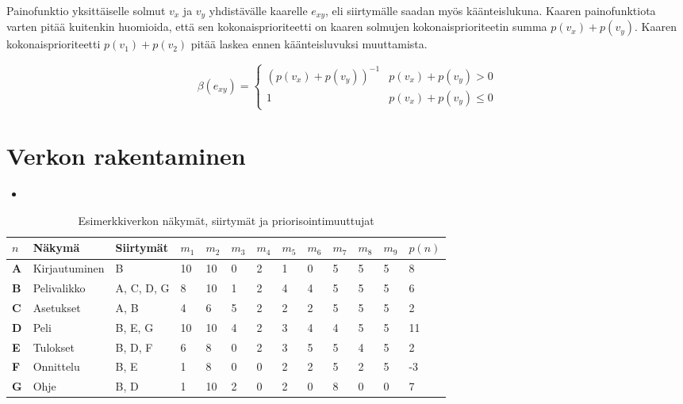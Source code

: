   Painofunktio yksittäiselle solmut \(v_x\) ja \(v_y\) yhdistävälle kaarelle \(e_{xy}\), eli siirtymälle saadan myös käänteislukuna.
  Kaaren painofunktiota varten pitää kuitenkin huomioida, että sen kokonaisprioriteetti on kaaren solmujen kokonaisprioriteetin summa \(p(v_x) + p(v_y)\).
  Kaaren kokonaisprioriteetti \(p(v_1) + p(v_2)\) pitää laskea ennen käänteisluvuksi muuttamista.

  \[\beta(e_{xy}) = \begin{cases}
    (p(v_x) + p(v_y))^{-1} & p(v_x) + p(v_y) > 0 \\
    1 & p(v_x) + p(v_y) \leq 0
  \end{cases}\]

\section{Verkon rakentaminen} \label{ch:10_verkon_rakentaminen}

  \begin{itemize}
    \item <TODO: Kirjoita teksti miten verkon solmut ja kaaret poimitaan käyttöliittymästä>
  \end{itemize}

  \begin{table}[H]
    \caption{Esimerkkiverkon näkymät, siirtymät ja priorisointimuuttujat}
    \label{tab:esimerkki_verkon_priorisointi_muuttujat}
    \centering
    \begin{tabular}{lllllllllllll} \hline
    \(n\) & \textbf{Näkymä} & \textbf{Siirtymät} & \(m_1\) & \(m_2\) & \(m_3\) & \(m_4\) & \(m_5\) & \(m_6\) & \(m_7\) & \(m_8\) & \(m_9\) & \(p(n)\) \\ \hline
    \textbf{A} & Kirjautuminen & B & 10 & 10 & 0 & 2 & 1 & 0 & 5 & 5 & 5 & 8 \\
    \textbf{B} & Pelivalikko & A, C, D, G & 8 & 10 & 1 & 2 & 4 & 4 & 5 & 5 & 5 & 6 \\
    \textbf{C} & Asetukset & A, B & 4 & 6 & 5 & 2 & 2 & 2 & 5 & 5 & 5 & 2 \\
    \textbf{D} & Peli & B, E, G & 10 & 10 & 4 & 2 & 3 & 4 & 4 & 5 & 5 & 11 \\
    \textbf{E} & Tulokset & B, D, F & 6 & 8 & 0 & 2 & 3 & 5 & 5 & 4 & 5 & 2 \\
    \textbf{F} & Onnittelu & B, E & 1 & 8 & 0 & 0 & 2 & 2 & 5 & 2 & 5 & -3 \\
    \textbf{G} & Ohje & B, D & 1 & 10 & 2 & 0 & 2 & 0 & 8 & 0 & 0 & 7 \\ \hline
    \end{tabular}
  \end{table}

